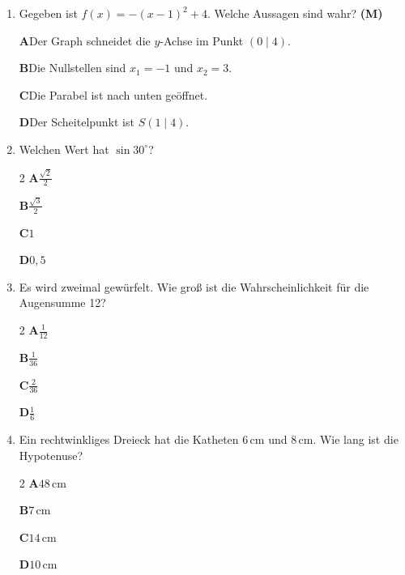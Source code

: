 \documentclass[11pt]{article}
\newcommand\kaestchen[1]{\makebox[1.4em][l]{$\square$}\textbf{#1}\enspace}
\begin{document}
\begin{enumerate}
\begin{multicols}{2}
\kaestchen{B}$90\,\text{cm}^3$\par
\kaestchen{C}$283\,\text{cm}^3$\par
\kaestchen{D}$94\,\text{cm}^3$\par
\end{multicols}
\item Gegeben ist $f(x) = -(x-1)^2 + 4$. Welche Aussagen sind wahr? \textbf{(M)}\par\nopagebreak
\kaestchen{A}Der Graph schneidet die $y$-Achse im Punkt $(0 \mid 4)$.\par
\kaestchen{B}Die Nullstellen sind $x_1 = -1$ und $x_2 = 3$.\par
\kaestchen{C}Die Parabel ist nach unten geöffnet.\par
\kaestchen{D}Der Scheitelpunkt ist $S(1 \mid 4)$.\par
\item Welchen Wert hat $\sin 30^\circ$?\par\nopagebreak
\begin{multicols}{2}
\kaestchen{A}$\frac{\sqrt2}{2}$\par
\kaestchen{B}$\frac{\sqrt3}{2}$\par
\kaestchen{C}$1$\par
\kaestchen{D}$0{,}5$\par
\end{multicols}
\item Es wird zweimal gewürfelt. Wie groß ist die Wahrscheinlichkeit für die Augensumme 12?\par\nopagebreak
\begin{multicols}{2}
\kaestchen{A}$\frac{1}{12}$\par
\kaestchen{B}$\frac{1}{36}$\par
\kaestchen{C}$\frac{2}{36}$\par
\kaestchen{D}$\frac{1}{6}$\par
\end{multicols}
\item Ein rechtwinkliges Dreieck hat die Katheten $6\,\text{cm}$ und $8\,\text{cm}$. Wie lang ist die Hypotenuse?\par\nopagebreak
\begin{multicols}{2}
\kaestchen{A}$48\,\text{cm}$\par
\kaestchen{B}$7\,\text{cm}$\par
\kaestchen{C}$14\,\text{cm}$\par
\kaestchen{D}$10\,\text{cm}$\par
\end{multicols}

\end{enumerate}
\end{document}
